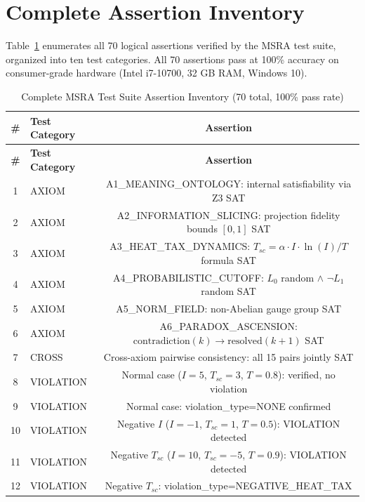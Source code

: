 \documentclass[11pt,a4paper]{article}
\begin{document}

\section{Complete Assertion Inventory}
\label{app:assertions}

Table~\ref{tab:assertions} enumerates all 70 logical assertions
verified by the MSRA test suite, organized into ten test categories.
All 70 assertions pass at 100\% accuracy on consumer-grade hardware
(Intel i7-10700, 32 GB RAM, Windows 10).

\begin{longtable}{|c|l|c|}
\caption{Complete MSRA Test Suite Assertion Inventory (70 total, 100\% pass rate)}
\label{tab:assertions} \\
\hline
\textbf{\#} & \textbf{Test Category} & \textbf{Assertion} \\
\hline
\endfirsthead
\hline
\textbf{\#} & \textbf{Test Category} & \textbf{Assertion} \\
\hline
\endhead
1 & AXIOM & A1\_MEANING\_ONTOLOGY: internal satisfiability via Z3 SAT \\
\hline
2 & AXIOM & A2\_INFORMATION\_SLICING: projection fidelity bounds $[0,1]$ SAT \\
\hline
3 & AXIOM & A3\_HEAT\_TAX\_DYNAMICS: $T_{sc} = \alpha\cdot I\cdot\ln(I)/T$ formula SAT \\
\hline
4 & AXIOM & A4\_PROBABILISTIC\_CUTOFF: $L_0$ random $\land$ $\neg L_1$ random SAT \\
\hline
5 & AXIOM & A5\_NORM\_FIELD: non-Abelian gauge group SAT \\
\hline
6 & AXIOM & A6\_PARADOX\_ASCENSION: $\mathrm{contradiction}(k)\to\mathrm{resolved}(k+1)$ SAT \\
\hline
7 & CROSS & Cross-axiom pairwise consistency: all 15 pairs jointly SAT \\
\hline
8 & VIOLATION & Normal case ($I=5$, $T_{sc}=3$, $T=0.8$): verified, no violation \\
\hline
9 & VIOLATION & Normal case: violation\_type=NONE confirmed \\
\hline
10 & VIOLATION & Negative $I$ ($I=-1$, $T_{sc}=1$, $T=0.5$): VIOLATION detected \\
\hline
11 & VIOLATION & Negative $T_{sc}$ ($I=10$, $T_{sc}=-5$, $T=0.9$): VIOLATION detected \\
\hline
12 & VIOLATION & Negative $T_{sc}$: violation\_type=NEGATIVE\_HEAT\_TAX \\

\end{longtable}
\end{document}
